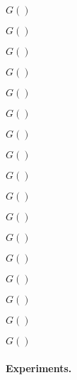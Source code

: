 \begin{lemma} %
  $G()$
\end{lemma}  

\begin{lemma} %
  $G()$
\end{lemma}  

\begin{lemma} %
  $G()$
\end{lemma}  

\begin{lemma} %
  $G()$
\end{lemma}  

\begin{lemma} %
  $G()$
\end{lemma}

\begin{lemma} %
  $G()$
\end{lemma}

\begin{lemma} %
  $G()$
\end{lemma}

\begin{lemma} %
  $G()$
\end{lemma}

\begin{lemma} %
  $G()$
\end{lemma}

\begin{lemma} %
  $G()$
\end{lemma}

\begin{lemma} %
  $G()$
\end{lemma}

\begin{lemma} %
  $G()$
\end{lemma}

\begin{lemma} %
  $G()$
\end{lemma}

\begin{lemma} %
  $G()$
\end{lemma}

\begin{lemma} %
  $G()$
\end{lemma}

\begin{lemma} %
  $G()$
\end{lemma}

\begin{lemma} %
  $G()$
\end{lemma}


\paragraph{Experiments.}





